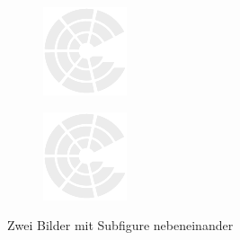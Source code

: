 \documentclass[a4paper, ngerman, oneside, 10pt]{article}
\begin{document}
\begin{figure}[!hbt]
	\centering
	\begin{subfigure}[b]{0.49\textwidth} %
		\includegraphics[width=\textwidth]{images/MCI_Logo.pdf}
		\label{fig:subfigure_1}
	\end{subfigure}
	\hfill
	\begin{subfigure}[b]{0.49\textwidth}
		\includegraphics[width=\textwidth]{images/MCI_Logo.pdf}
		\label{fig:subfigure_2}
	\end{subfigure}
	\caption{Zwei Bilder mit Subfigure nebeneinander}
	\label{fig:subfigure}
\end{figure}
\end{document}
